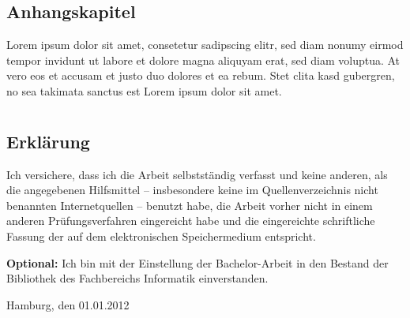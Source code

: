 \documentclass[
	12pt,
	a4paper,
	BCOR10mm,
	DIV14,
	listof=totoc,
	bibliography=totoc,
	headsepline
]{scrreprt}
\begin{document}



\listoffigures

\listoftables

\lstlistoflistings

\begin{appendices}

\chapter{Anhangskapitel}

Lorem ipsum dolor sit amet, consetetur sadipscing elitr, sed diam nonumy eirmod tempor invidunt ut labore et dolore magna aliquyam erat, sed diam voluptua.
At vero eos et accusam et justo duo dolores et ea rebum.
Stet clita kasd gubergren, no sea takimata sanctus est Lorem ipsum dolor sit amet.

\end{appendices}

\newpage

\thispagestyle{empty}

\chapter*{}

\section*{Erklärung}

Ich versichere, dass ich die Arbeit selbstständig verfasst und keine anderen, als die angegebenen Hilfsmittel -- insbesondere keine im Quellenverzeichnis nicht benannten Internetquellen -- benutzt habe, die Arbeit vorher nicht in einem anderen Prüfungsverfahren eingereicht habe und die eingereichte schriftliche Fassung der auf dem elektronischen Speichermedium entspricht.

\smallskip

\textbf{Optional:} Ich bin mit der Einstellung der Bachelor-Arbeit in den Bestand der Bibliothek des Fachbereichs Informatik einverstanden.

\bigskip
\bigskip
\bigskip

Hamburg, den 01.01.2012  \quad \dotfill
\end{document}
